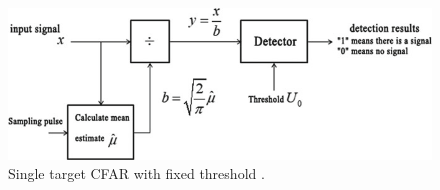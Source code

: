    \begin{figure}
   	\begin{centering}
   		\includegraphics[width=0.75\linewidth,keepaspectratio]{Bilder/CFAR.png}
   		\caption{Single target \ac{CFAR} with fixed threshold  \cite{EnvPerc}.}
   		\label{fig_CFAR}%
   	\end{centering}
   \end{figure}
  
   

